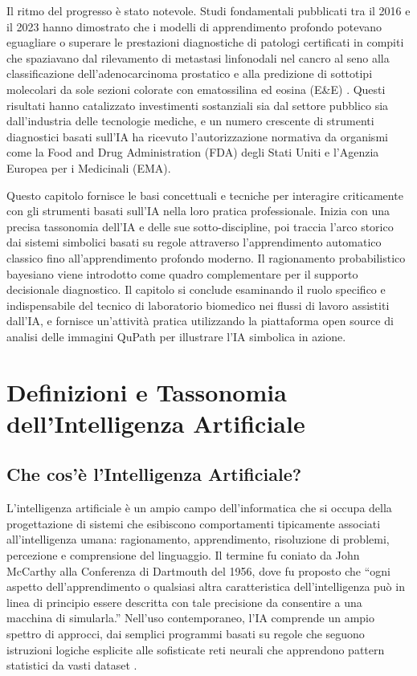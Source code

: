Il ritmo del progresso è stato notevole. Studi fondamentali pubblicati tra il 2016 e il 2023 hanno dimostrato che i modelli di apprendimento profondo potevano eguagliare o superare le prestazioni diagnostiche di patologi certificati in compiti che spaziavano dal rilevamento di metastasi linfonodali nel cancro al seno alla classificazione dell'adenocarcinoma prostatico e alla predizione di sottotipi molecolari da sole sezioni colorate con ematossilina ed eosina (E\&E) \cite{song2023}. Questi risultati hanno catalizzato investimenti sostanziali sia dal settore pubblico sia dall'industria delle tecnologie mediche, e un numero crescente di strumenti diagnostici basati sull'IA ha ricevuto l'autorizzazione normativa da organismi come la Food and Drug Administration (FDA) degli Stati Uniti e l'Agenzia Europea per i Medicinali (EMA).

Questo capitolo fornisce le basi concettuali e tecniche per interagire criticamente con gli strumenti basati sull'IA nella loro pratica professionale. Inizia con una precisa tassonomia dell'IA e delle sue sotto-discipline, poi traccia l'arco storico dai sistemi simbolici basati su regole attraverso l'apprendimento automatico classico fino all'apprendimento profondo moderno. Il ragionamento probabilistico bayesiano viene introdotto come quadro complementare per il supporto decisionale diagnostico. Il capitolo si conclude esaminando il ruolo specifico e indispensabile del tecnico di laboratorio biomedico nei flussi di lavoro assistiti dall'IA, e fornisce un'attività pratica utilizzando la piattaforma open source di analisi delle immagini QuPath \cite{bankhead2017} per illustrare l'IA simbolica in azione.

\section{Definizioni e Tassonomia dell'Intelligenza Artificiale}
\label{sec:ch3_taxonomy}

\subsection{Che cos'è l'Intelligenza Artificiale?}

L'intelligenza artificiale è un ampio campo dell'informatica che si occupa della progettazione di sistemi che esibiscono comportamenti tipicamente associati all'intelligenza umana: ragionamento, apprendimento, risoluzione di problemi, percezione e comprensione del linguaggio. Il termine fu coniato da John McCarthy alla Conferenza di Dartmouth del 1956, dove fu proposto che ``ogni aspetto dell'apprendimento o qualsiasi altra caratteristica dell'intelligenza può in linea di principio essere descritta con tale precisione da consentire a una macchina di simularla.'' Nell'uso contemporaneo, l'IA comprende un ampio spettro di approcci, dai semplici programmi basati su regole che seguono istruzioni logiche esplicite alle sofisticate reti neurali che apprendono pattern statistici da vasti dataset \cite{rashidi2019}.

